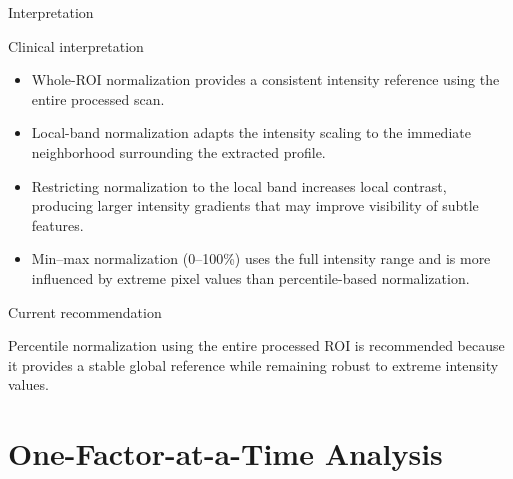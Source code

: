\documentclass[aspectratio=169]{beamer}
\begin{document}
\begin{frame}{Interpretation}

\begin{block}{Clinical interpretation}

\begin{itemize}
\item Whole-ROI normalization provides a consistent intensity reference using the entire processed scan.
\item Local-band normalization adapts the intensity scaling to the immediate neighborhood surrounding the extracted profile.
\item Restricting normalization to the local band increases local contrast, producing larger intensity gradients that may improve visibility of subtle features.
\item Min--max normalization (0--100\%) uses the full intensity range and is more influenced by extreme pixel values than percentile-based normalization.
\end{itemize}

\end{block}

\vspace{0.4cm}

\begin{alertblock}{Current recommendation}

Percentile normalization  using the entire processed ROI is recommended because it provides a stable global reference while remaining robust to extreme intensity values.

\end{alertblock}

\end{frame}

\section{One-Factor-at-a-Time Analysis}
\end{document}
